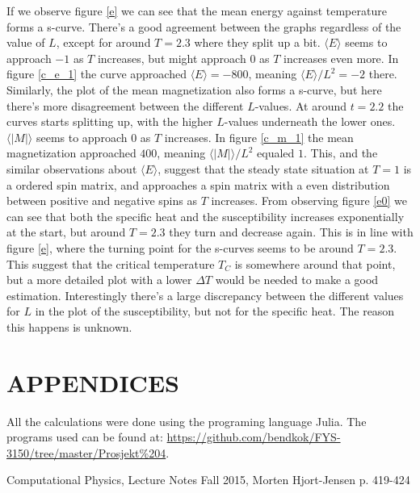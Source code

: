 \documentclass[a4paper]{article}
\let\Oldsection\section
\renewcommand{\section}{\FloatBarrier\Oldsection}
\begin{document}
If we observe figure \ref{e} we can see that the mean energy against temperature forms a s-curve. There's a good agreement between the graphs regardless of the value of $L$, except for around $T=2.3$ where they split up a bit.  $\langle E\rangle$ seems to approach $-1$ as $T$ increases, but might approach $0$ as $T$ increases even more. In figure \ref{c_e_1} the curve approached $\langle E\rangle=-800$, meaning $\langle E\rangle/L^2 = -2$ there. Similarly, the plot of the mean magnetization also forms a s-curve, but here there's more disagreement between the different $L$-values. At around $t=2.2$ the curves starts splitting up, with the higher $L$-values underneath the lower ones. $\langle |M|\rangle$ seems to approach $0$ as $T$ increases. In figure \ref{c_m_1} the mean magnetization approached $400$, meaning $\langle |M|\rangle/L^2$ equaled $1$. This, and the similar observations about $\langle E\rangle$, suggest that the steady state situation at $T=1$ is a ordered spin matrix, and approaches a spin matrix with a even distribution between positive and negative spins as $T$ increases. From observing figure \ref{e0} we can see that both the specific heat and the susceptibility increases exponentially at the start, but around $T=2.3$ they turn and decrease again. This is in line with figure \ref{e}, where the turning point for the s-curves seems to be around $T=2.3$. This suggest that the critical temperature $T_C$ is somewhere around that point, but a more detailed plot with a lower $\Delta T$ would be needed to make a good estimation. Interestingly there's a large discrepancy between the different values for $L$ in the plot of the susceptibility, but not for the specific heat. The reason this happens is unknown.



\section{APPENDICES}
All the calculations were done using the programing language Julia. The programs used can be found at:
\url{https://github.com/bendkok/FYS-3150/tree/master/Prosjekt%204}.
	
	\begin{thebibliography}{9}
		Computational Physics, Lecture Notes Fall 2015, Morten Hjort-Jensen p. 419-424
	\end{thebibliography}
	
\end{document}
